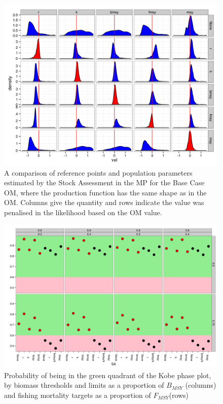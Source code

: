 \documentclass[%
nonumbib,      %
%
]{nrc1}                          %
\begin{document}
\begin{figure}[htbp]
\centering
\includegraphics[width=6in]{SA2.png}
\caption{A comparison of reference points and population parameters estimated by the Stock Assessment in the MP for the Base Case OM, where the production function has the same shape as in the OM. Columns give the quantity and rows indicate the value was penalised in the likelihood based on the OM value.}
\label{fig:sa2}
\end{figure}


\begin{figure}[htbp]
\centering
\includegraphics[width=6in]{ssGreen.png}
\caption{Probability of being in the green quadrant of the Kobe phase plot, by biomass thresholds and limits as a proportion of $B_{MSY}$ (columns) and fishing mortality targets as a proportion of $F_{MSY}$(rows)}
\label{fig:ssGreen}
\end{figure}
\end{document}
